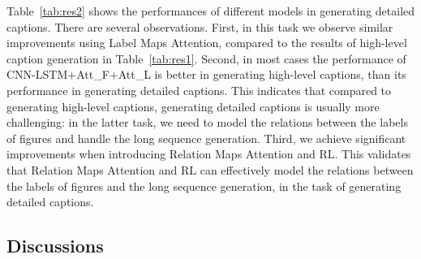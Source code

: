 \documentclass[11pt,a4paper]{article}
\begin{document}

Table~\ref{tab:res2} shows the performances of different models in generating detailed captions. There are several observations.
First, in this task we observe similar improvements using Label Maps Attention, compared to the results of high-level caption generation in Table~\ref{tab:res1}.
Second, in most cases the performance of CNN-LSTM+Att\_F+Att\_L is better in generating high-level captions, than its performance in generating detailed captions. This indicates that compared to generating high-level captions, generating detailed captions is usually more challenging: in the latter task, we need to model the relations between the labels of figures and handle the long sequence generation.
Third, we achieve significant improvements when introducing Relation Maps Attention and RL. This validates that Relation Maps Attention and RL can effectively model the relations between the labels of figures and the long sequence generation, in the task of generating detailed captions. 






\subsection{Discussions}
\end{document}
